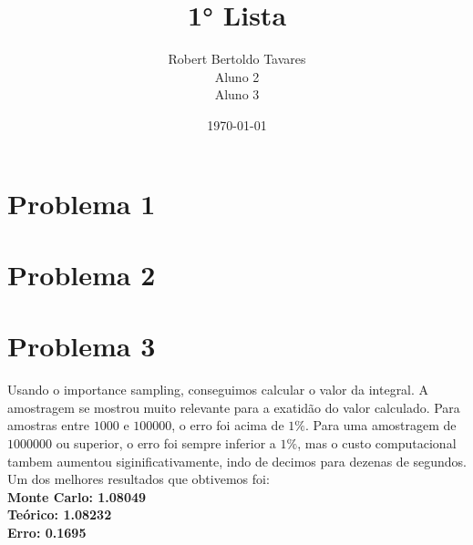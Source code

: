 \documentclass[a4paper, 12pt]{article}
\title{\textbf{1° Lista}}
\author{
    Robert Bertoldo Tavares \\
    Aluno 2 \\
    Aluno 3
}
\date{\today}
\begin{document}
\maketitle
\thispagestyle{fancy}

\section*{Problema 1}
\section*{Problema 2}
\section*{Problema 3}
Usando o importance sampling, conseguimos calcular o valor da integral. A amostragem se mostrou 
muito relevante para a exatidão do valor calculado. Para amostras entre \(1000\) e \(100000\), o erro
foi acima de \(1\%\). Para uma amostragem de \(1000000\) ou superior, o erro foi sempre inferior a \(1\%\),
mas o custo computacional tambem aumentou siginificativamente, indo de decimos para dezenas de segundos. 
Um dos melhores resultados que obtivemos foi:
\\

\noindent\textbf{Monte Carlo: 1.08049}\\
\textbf{Teórico: 1.08232}\\
\textbf{Erro: 0.1695}
\end{document}

